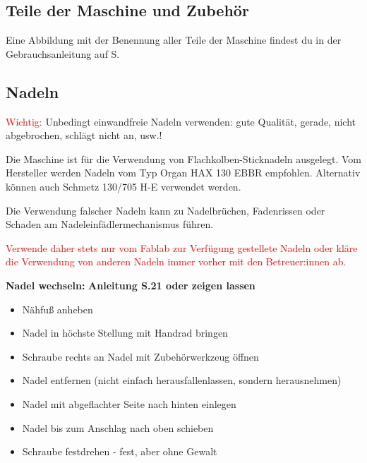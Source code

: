 \documentclass{\basedir/fablab-document}
\begin{document}
\subsection{Teile der Maschine und Zubehör}

Eine Abbildung mit der Benennung aller Teile der Maschine findest du in der Gebrauchsanleitung auf S. %


\subsection{Nadeln}
\textcolor{red}{Wichtig:} Unbedingt einwandfreie Nadeln verwenden: gute Qualität, gerade, nicht abgebrochen, schlägt nicht an, usw.!

Die Maschine ist für die Verwendung von Flachkolben-Sticknadeln ausgelegt. Vom Hersteller werden Nadeln vom Typ Organ HAX 130 EBBR empfohlen. Alternativ können auch Schmetz 130/705 H-E verwendet werden. 
 
Die Verwendung falscher Nadeln kann zu Nadelbrüchen, Fadenrissen oder Schaden am Nadeleinfädlermechanismus führen.

\textcolor{red}{Verwende daher stets nur vom Fablab zur Verfügung gestellete Nadeln oder kläre die Verwendung von anderen Nadeln immer vorher mit den Betreuer:innen ab.}

\vspace{2em}

\textbf{Nadel wechseln:}
\newline \textbf{Anleitung S.21 oder zeigen lassen}
\begin{itemize}
	\item Nähfuß anheben
	\item Nadel in höchste Stellung mit Handrad bringen
	\item Schraube rechts an Nadel mit Zubehörwerkzeug öffnen
	\item Nadel entfernen (nicht einfach herausfallenlassen, sondern herausnehmen)
	\item Nadel mit abgeflachter Seite nach hinten einlegen
	\item Nadel bis zum Anschlag nach oben schieben
	\item Schraube festdrehen -  fest, aber ohne Gewalt
	
\end{itemize}

\vspace{2em}
\end{document}
